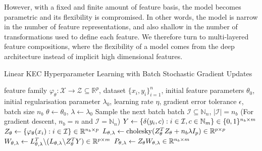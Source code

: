 \documentclass{article}
\newcommand{\note}[1]{{\color{orange} #1}}
\begin{document}
		
		However, with a fixed and finite amount of feature basis, the model becomes parametric and its flexibility is compromised. In other words, the model is narrow in the number of feature representations, and also shallow in the number of transformations used to define each feature. We therefore turn to multi-layered feature compositions, where the flexibility of a model comes from the deep architecture instead of implicit high dimensional features.

		\begin{algorithm}[tb]
			\caption{Linear KEC Hyperparameter Learning with Batch Stochastic Gradient Updates}
			\label{alg:linear_kernel_embedding_classifier_training}
			\begin{algorithmic}[1]
				 feature family $\varphi_{\theta} : \mathcal{X} \to \mathcal{Z} \subseteq \mathbb{R}^{p}$, dataset $\{x_{i}, y_{i}\}_{i = 1}^{n}$, initial feature parameters $\theta_{0}$, initial regularisation parameter $\lambda_{0}$, learning rate $\eta$, gradient error tolerance $\epsilon$, batch size $n_{b}$
				\STATE $\theta \leftarrow \theta_{0}$, $\lambda \leftarrow \lambda_{0}$
				\REPEAT
				\STATE Sample the next batch batch $\mathcal{I} \subseteq \mathbb{N}_{n}$, $| \mathcal{I} | = n_{b}$ \hspace{\fill} (For gradient descent, $n_{b} = n$ and $\mathcal{I} = \mathbb{N}_{n}$)
				\STATE $Y \leftarrow \{\delta(y_{i}, c) : i \in \mathcal{I}, c \in \mathbb{N}_{m}\} \hspace{\fill} \in \{0, 1\}^{n_{b} \times m}$
				\STATE $Z_{\theta} \leftarrow \{\varphi_{\theta}(x_{i}) : i \in \mathcal{I}\} \hspace{\fill} \in \mathbb{R}^{n_{b} \times p}$
				\STATE $L_{\theta, \lambda} \leftarrow \mathrm{cholesky}(Z_{\theta}^{T} Z_{\theta} + n_{b} \lambda I_{p}) \hspace{\fill} \in \mathbb{R}^{p \times p}$
				\STATE $W_{\theta, \lambda} \leftarrow L_{\theta, \lambda}^{T} \backslash (L_{\theta, \lambda} \backslash Z_{\theta}^{T} Y) \hspace{\fill} \in \mathbb{R}^{p \times m}$
				\STATE $P_{\theta, \lambda} \leftarrow Z_{\theta} W_{\theta, \lambda} \hspace{\fill} \in \mathbb{R}^{n_{b} \times m}$

\end{algorithmic}
\end{algorithm}
\end{document}
